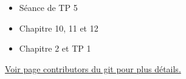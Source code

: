   \begin{itemize}
    \item Séance de TP 5
  \end{itemize}
  \begin{itemize}
    \item Chapitre 10, 11 et 12
  \end{itemize}
  \begin{itemize}
    \item Chapitre 2 et TP 1
  \end{itemize}
\href{https://github.com/blegat/LINMA1691/graphs/contributors}{Voir page contributors du git pour plus détails.}

\clearpage
\printindex


